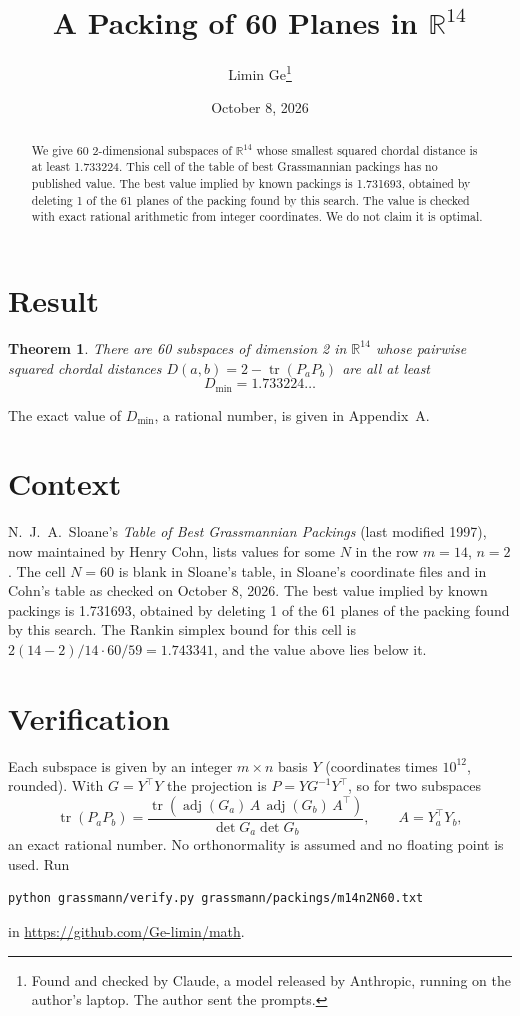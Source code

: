 \documentclass[11pt,a4paper]{article}
\title{A Packing of 60 Planes in $\mathbb{R}^{14}$}
\author{Limin Ge\thanks{Found and checked by Claude, a model released by Anthropic, running on the author's laptop. The author sent the prompts.}}
\date{October 8, 2026}
\newtheorem*{theorem}{Theorem}
\begin{document}
\maketitle
\begin{abstract}
We give 60 2-dimensional subspaces of $\mathbb{R}^{14}$ whose smallest squared chordal distance is at least 1.733224. This cell of the table of best Grassmannian packings has no published value. The best value implied by known packings is 1.731693, obtained by deleting 1 of the 61 planes of the packing found by this search. The value is checked with exact rational arithmetic from integer coordinates. We do not claim it is optimal.
\end{abstract}

\section{Result}
\begin{theorem}
There are 60 subspaces of dimension 2 in $\mathbb{R}^{14}$ whose pairwise squared chordal distances $D(a,b) = 2 - \operatorname{tr}(P_aP_b)$ are all at least
\[ D_{\min} = 1.733224\ldots \]
\end{theorem}
The exact value of $D_{\min}$, a rational number, is given in Appendix~A.


\section{Context}
N.~J.~A.~Sloane's \emph{Table of Best Grassmannian Packings} (last modified 1997), now maintained by Henry Cohn, lists values for some $N$ in the row $m=14$, $n=2$. The cell $N=60$ is blank in Sloane's table, in Sloane's coordinate files and in Cohn's table as checked on October 8, 2026. The best value implied by known packings is 1.731693, obtained by deleting 1 of the 61 planes of the packing found by this search. The Rankin simplex bound for this cell is $2(14-2)/14\cdot 60/59 = 1.743341$, and the value above lies below it.


\section{Verification}
Each subspace is given by an integer $m\times n$ basis $Y$ (coordinates times $10^{12}$, rounded). With $G=Y^\top Y$ the projection is $P=YG^{-1}Y^\top$, so for two subspaces
\[ \operatorname{tr}(P_aP_b)=\frac{\operatorname{tr}(\operatorname{adj}(G_a)\,A\,\operatorname{adj}(G_b)\,A^\top)}{\det G_a\det G_b},\qquad A=Y_a^\top Y_b, \]
an exact rational number. No orthonormality is assumed and no floating point is used. Run
\begin{verbatim}
python grassmann/verify.py grassmann/packings/m14n2N60.txt
\end{verbatim}
in \url{https://github.com/Ge-limin/math}.
\end{document}
